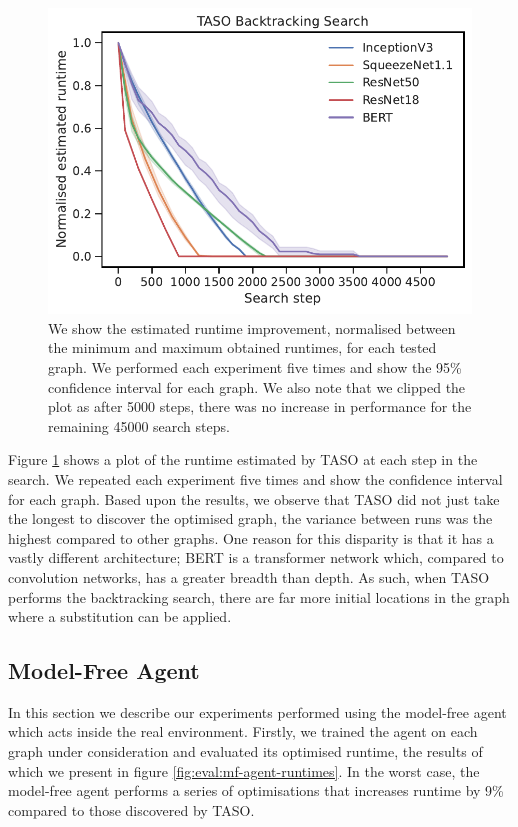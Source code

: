 \begin{figure}[h]
  \centering
  \includegraphics[width=1\columnwidth]{sections/5evaluation/images/taso_graph_search}
  \caption[TASO backtracking search]{We show the estimated runtime improvement, normalised between the minimum and maximum obtained runtimes, for each tested graph. We performed each experiment five times and show the 95\% confidence interval for each graph. We also note that we clipped the plot as after 5000 steps, there was no increase in performance for the remaining 45000 search steps.}
  \label{fig:eval:baseline-taso-search}
\end{figure}

Figure \ref{fig:eval:baseline-taso-search} shows a plot of the runtime estimated by TASO at each step in the search. We repeated each experiment five times and show the confidence interval for each graph. Based upon the results, we observe that TASO did not just take the longest to discover the optimised graph, the variance between runs was the highest compared to other graphs. One reason for this disparity is that it has a vastly different architecture; BERT is a transformer network which, compared to convolution networks, has a greater breadth than depth. As such, when TASO performs the backtracking search, there are far more initial locations in the graph where a substitution can be applied.

\subsection{Model-Free Agent}
\label{sec:eval:subsec:mfagent}

In this section we describe our experiments performed using the model-free agent which acts inside the real environment. Firstly, we trained the agent on each graph under consideration and evaluated its optimised runtime, the results of which we present in figure \ref{fig:eval:mf-agent-runtimes}. In the worst case, the model-free agent performs a series of optimisations that increases runtime by 9\% compared to those discovered by TASO.

